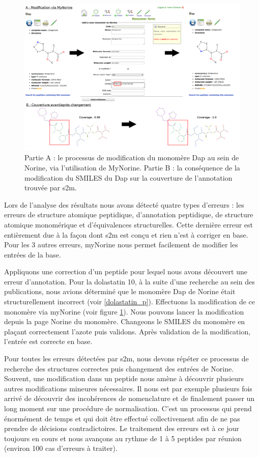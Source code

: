 \begin{figure}[h!]
  \begin{center}
    \includegraphics[width=450px]{Figures/contributions/dap_modif.png}
    \caption{\label{dap_modif}Partie A : le processus de modification du monomère Dap au sein de Norine, via l'utilisation de MyNorine.
    Partie B : la conséquence de la modification du SMILES du Dap sur la couverture de l'annotation trouvée par s2m.}
  \end{center}
\end{figure}

Lors de l'analyse des résultats nous avons détecté quatre types d'erreurs : les erreurs de structure atomique peptidique, d'annotation peptidique, de structure atomique monomérique et d'équivalences structurelles.
Cette dernière erreur est entièrement due à la façon dont s2m est conçu et rien n'est à corriger en base.
Pour les 3 autres erreurs, myNorine nous permet facilement de modifier les entrées de la base.

Appliquons une correction d'un peptide pour lequel nous avons découvert une erreur d'annotation.
Pour la dolastatin 10, à la suite d'une recherche au sein des publications, nous avions déterminé que le monomère Dap de Norine était structurellement incorrect (voir \ref{dolastatin_p}).
Effectuons la modification de ce monomère via myNorine (voir figure \ref{dap_modif}).
Nous pouvons lancer la modification depuis la page Norine du monomère.
Changeons le SMILES du monomère en plaçant correctement l'azote puis validons.
Après validation de la modification, l'entrée est correcte en base.

Pour toutes les erreurs détectées par s2m, nous devons répéter ce processus de recherche des structures correctes puis changement des entrées de Norine.
Souvent, une modification dans un peptide nous amène à découvrir plusieurs autres modifications mineures nécessaires.
Il nous est par exemple plusieurs fois arrivé de découvrir des incohérences de nomenclature et de finalement passer un long moment sur une procédure de normalisation.
C'est un processus qui prend énormément de temps et qui doit être effectué collectivement afin de ne pas prendre de décisions contradictoires.
Le traitement des erreurs est à ce jour toujours en cours et nous avançons au rythme de 1 à 5 peptides par réunion (environ 100 cas d'erreurs à traiter).



